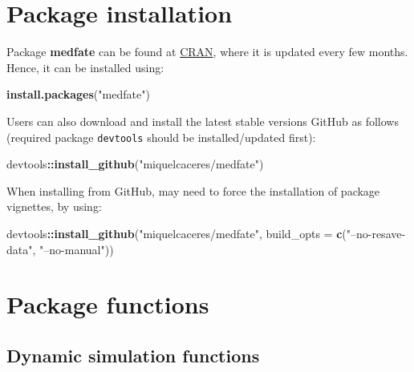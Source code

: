 \documentclass[]{book}
\newenvironment{Shaded}{\begin{snugshade}}{\end{snugshade}}
\newcommand{\KeywordTok}[1]{\textcolor[rgb]{0.13,0.29,0.53}{\textbf{#1}}}
\newcommand{\DataTypeTok}[1]{\textcolor[rgb]{0.13,0.29,0.53}{#1}}
\newcommand{\StringTok}[1]{\textcolor[rgb]{0.31,0.60,0.02}{#1}}
\newcommand{\OperatorTok}[1]{\textcolor[rgb]{0.81,0.36,0.00}{\textbf{#1}}}
\newcommand{\NormalTok}[1]{#1}
\begin{document}
\hypertarget{package-installation}{%
\section{Package installation}\label{package-installation}}

Package \textbf{medfate} can be found at \href{https://CRAN.R-project.org/package=medfate}{CRAN}, where it is updated every few months. Hence, it can be installed using:

\begin{Shaded}
\begin{Highlighting}[]
\KeywordTok{install.packages}\NormalTok{(}\StringTok{"medfate"}\NormalTok{)}
\end{Highlighting}
\end{Shaded}

Users can also download and install the latest stable versions GitHub as follows (required package \texttt{devtools} should be installed/updated first):

\begin{Shaded}
\begin{Highlighting}[]
\NormalTok{devtools}\OperatorTok{::}\KeywordTok{install_github}\NormalTok{(}\StringTok{"miquelcaceres/medfate"}\NormalTok{)}
\end{Highlighting}
\end{Shaded}

When installing from GitHub, may need to force the installation of package vignettes, by using:

\begin{Shaded}
\begin{Highlighting}[]
\NormalTok{devtools}\OperatorTok{::}\KeywordTok{install_github}\NormalTok{(}\StringTok{"miquelcaceres/medfate"}\NormalTok{, }
                         \DataTypeTok{build_opts =} \KeywordTok{c}\NormalTok{(}\StringTok{"--no-resave-data"}\NormalTok{, }\StringTok{"--no-manual"}\NormalTok{))}
\end{Highlighting}
\end{Shaded}

\hypertarget{package-functions}{%
\section{Package functions}\label{package-functions}}

\hypertarget{dynamic-simulation-functions}{%
\subsection{Dynamic simulation functions}\label{dynamic-simulation-functions}}
\end{document}
